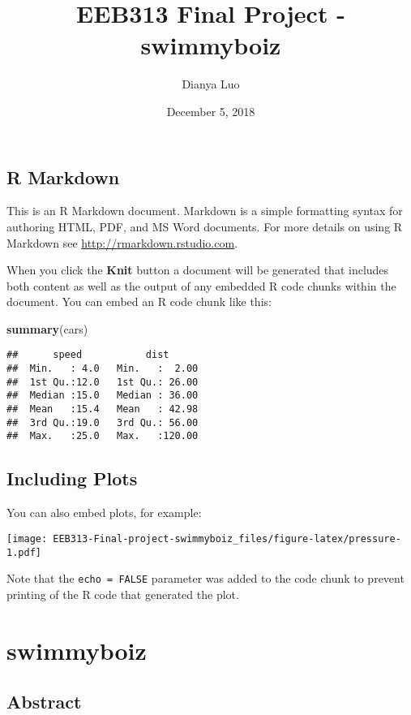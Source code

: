 \documentclass[]{article}
\title{EEB313 Final Project - swimmyboiz}
\author{Dianya Luo}
\date{December 5, 2018}
\newenvironment{Shaded}{\begin{snugshade}}{\end{snugshade}}
\newcommand{\KeywordTok}[1]{\textcolor[rgb]{0.13,0.29,0.53}{\textbf{#1}}}
\newcommand{\NormalTok}[1]{#1}
\begin{document}
\maketitle

\subsection{R Markdown}\label{r-markdown}

This is an R Markdown document. Markdown is a simple formatting syntax
for authoring HTML, PDF, and MS Word documents. For more details on
using R Markdown see \url{http://rmarkdown.rstudio.com}.

When you click the \textbf{Knit} button a document will be generated
that includes both content as well as the output of any embedded R code
chunks within the document. You can embed an R code chunk like this:

\begin{Shaded}
\begin{Highlighting}[]
\KeywordTok{summary}\NormalTok{(cars)}
\end{Highlighting}
\end{Shaded}

\begin{verbatim}
##      speed           dist       
##  Min.   : 4.0   Min.   :  2.00  
##  1st Qu.:12.0   1st Qu.: 26.00  
##  Median :15.0   Median : 36.00  
##  Mean   :15.4   Mean   : 42.98  
##  3rd Qu.:19.0   3rd Qu.: 56.00  
##  Max.   :25.0   Max.   :120.00
\end{verbatim}

\subsection{Including Plots}\label{including-plots}

You can also embed plots, for example:

\texttt{[image: EEB313-Final-project-swimmyboiz\_files/figure-latex/pressure-1.pdf]}

Note that the \texttt{echo\ =\ FALSE} parameter was added to the code
chunk to prevent printing of the R code that generated the plot.

\section{swimmyboiz}\label{swimmyboiz}

\subsection{Abstract}\label{abstract}
\end{document}
